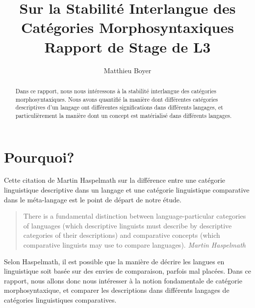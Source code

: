 \documentclass{cours}
\title{Sur la Stabilité Interlangue des Catégories Morphosyntaxiques\\ \small Rapport de Stage de L3}
\author{Matthieu Boyer}
\date{}
\begin{document}
    \begin{abstract}
        Dans ce rapport, nous nous intéressons à la stabilité interlangue des catégories morphosyntaxiques.
        Nous avons quantifié la manière dont différentes catégories descriptives d'un langage ont différentes
        significations dans différents langages,
        et particulièrement la manière dont un concept est matérialisé dans différents langages.
    \end{abstract}


    \section{Pourquoi?}
    Cette citation de Martin Haspelmath sur la différence entre une catégorie linguistique descriptive dans un langage et une catégorie linguistique comparative dans le méta-langage est le point de départ de notre étude.
    \begin{quote}
        There is a fundamental distinction between language-particular categories of languages (which descriptive
        linguists must describe by descriptive categories of their descriptions) and comparative concepts (which
        comparative linguists may use to compare languages).
        {\flushright
    {\textit{Martin Haspelmath} \cite{Has18}}}
    \end{quote}
    Selon Haspelmath, il est possible que la manière de décrire les langues en linguistique soit basée sur des envies de comparaison, parfois mal placées.
    Dans ce rapport, nous allons donc nous intéresser à la notion fondamentale de catégorie morphosyntaxique, et
    comparer les descriptions dans différents langages de catégories linguistiques comparatives.
\end{document}

